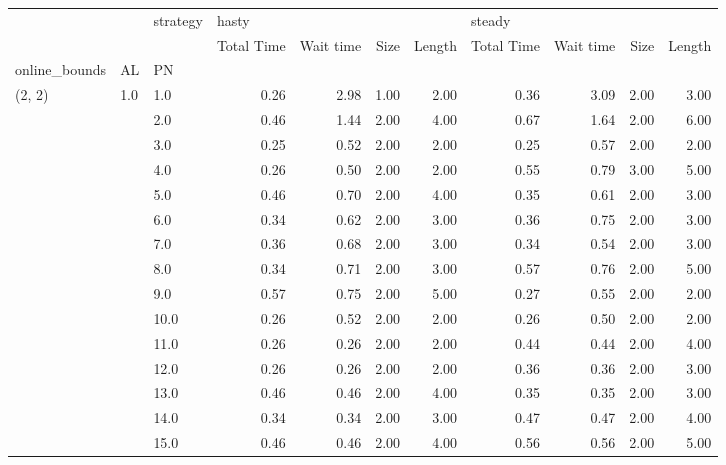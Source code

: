 \begin{tabular}{lllrrrrrrrr}
\toprule
       &     & strategy & \multicolumn{4}{l}{hasty} & \multicolumn{4}{l}{steady} \\
       &     & {} & Total Time & Wait time & Size & Length & Total Time & Wait time & Size & Length \\
online\_bounds & AL & PN &            &           &      &        &            &           &      &        \\
\midrule
(2, 2) & 1.0 & 1.0  &       0.26 &      2.98 & 1.00 &   2.00 &       0.36 &      3.09 & 2.00 &   3.00 \\
       &     & 2.0  &       0.46 &      1.44 & 2.00 &   4.00 &       0.67 &      1.64 & 2.00 &   6.00 \\
       &     & 3.0  &       0.25 &      0.52 & 2.00 &   2.00 &       0.25 &      0.57 & 2.00 &   2.00 \\
       &     & 4.0  &       0.26 &      0.50 & 2.00 &   2.00 &       0.55 &      0.79 & 3.00 &   5.00 \\
       &     & 5.0  &       0.46 &      0.70 & 2.00 &   4.00 &       0.35 &      0.61 & 2.00 &   3.00 \\
       &     & 6.0  &       0.34 &      0.62 & 2.00 &   3.00 &       0.36 &      0.75 & 2.00 &   3.00 \\
       &     & 7.0  &       0.36 &      0.68 & 2.00 &   3.00 &       0.34 &      0.54 & 2.00 &   3.00 \\
       &     & 8.0  &       0.34 &      0.71 & 2.00 &   3.00 &       0.57 &      0.76 & 2.00 &   5.00 \\
       &     & 9.0  &       0.57 &      0.75 & 2.00 &   5.00 &       0.27 &      0.55 & 2.00 &   2.00 \\
       &     & 10.0 &       0.26 &      0.52 & 2.00 &   2.00 &       0.26 &      0.50 & 2.00 &   2.00 \\
       &     & 11.0 &       0.26 &      0.26 & 2.00 &   2.00 &       0.44 &      0.44 & 2.00 &   4.00 \\
       &     & 12.0 &       0.26 &      0.26 & 2.00 &   2.00 &       0.36 &      0.36 & 2.00 &   3.00 \\
       &     & 13.0 &       0.46 &      0.46 & 2.00 &   4.00 &       0.35 &      0.35 & 2.00 &   3.00 \\
       &     & 14.0 &       0.34 &      0.34 & 2.00 &   3.00 &       0.47 &      0.47 & 2.00 &   4.00 \\
       &     & 15.0 &       0.46 &      0.46 & 2.00 &   4.00 &       0.56 &      0.56 & 2.00 &   5.00 \\

\end{tabular}
